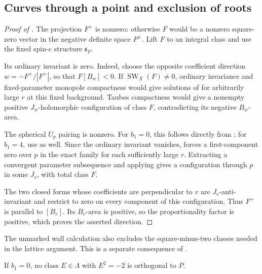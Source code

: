 \subsection{Curves through a point and exclusion of roots}

\begin{proof}[Proof of ]
The projection \(F^+\) is nonzero: otherwise \(F\) would be a
nonzero square-zero vector in the negative definite space
\(P^\perp\).  Lift \(F\) to an integral class and use the
fixed spin-c structure \(\mathfrak s_F\).

Its ordinary invariant is zero.  Indeed, choose the opposite
coefficient direction \(w=-F^+/|F^+|\), so that
\(F[B_w]<0\).  If \(\operatorname{SW}_X(F)\ne0\),
ordinary invariance and fixed-parameter monopole compactness would
give solutions of  for arbitrarily
large \(r\) at this fixed background.  Taubes compactness would
give a nonempty positive \(J_w\)-holomorphic configuration of
class \(F\), contradicting its negative \(B_w\)-area.

The spherical \(U_p\) pairing is nonzero.  For \(b_1=0\),
this follows directly from ;
for \(b_1=4\), use  as well.  Since the
ordinary invariant vanishes, 
forces a first-component zero over \(p\) in the exact family for
each sufficiently large \(r\).  Extracting a convergent parameter
subsequence and applying
 gives a configuration through
\(p\) in some \(J_v\), with total class \(F\).

The two closed forms whose coefficients are perpendicular to \(v\)
are \(J_v\)-anti-invariant and restrict to zero on every component
of this configuration.  Thus \(F^+\) is parallel to \([B_v]\).
Its \(B_v\)-area is positive, so the proportionality factor is
positive, which proves the asserted direction.
\end{proof}

The unmarked wall calculation also excludes the square-minus-two classes
needed in the lattice argument.  This is a separate consequence of
.

\begin{proposition}
 \label{prop:root-exclusion}
 If \(b_1=0\), no class \(E\in\Lambda\) with \(E^2=-2\)
 is orthogonal to \(P\).
\end{proposition}

